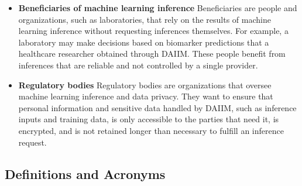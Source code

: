 \documentclass[12pt]{article}
\begin{document}
\begin{itemize}
    \item \textbf{Beneficiaries of machine learning inference} \newline
    Beneficiaries are people and organizations, such as laboratories, that rely on the results of machine learning inference without requesting inferences themselves.
    For example, a laboratory may make decisions based on biomarker predictions that a healthcare researcher obtained through DAIIM.
    These people benefit from inferences that are reliable and not controlled by a single provider.

    \item \textbf{Regulatory bodies} \newline
    Regulatory bodies are organizations that oversee machine learning inference and data privacy.
    They want to ensure that personal information and sensitive data handled by DAIIM, such as inference inputs and training data, is only accessible to the parties that need it, is encrypted, and is not retained longer than necessary to fulfill an inference request.
\end{itemize}

\subsection{Definitions and Acronyms}
\end{document}
